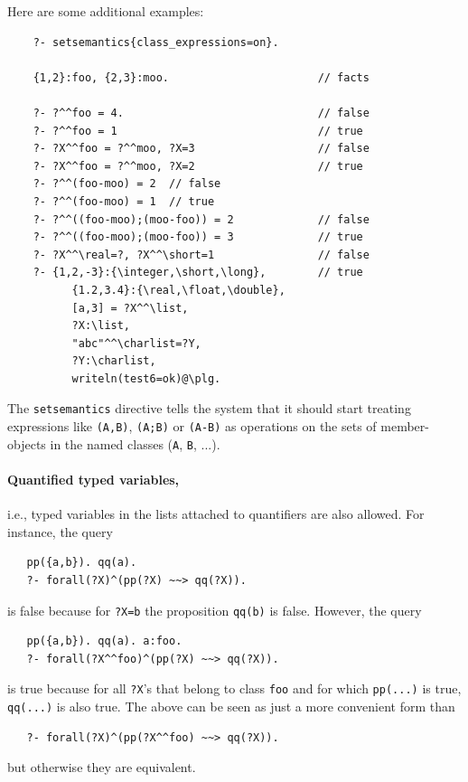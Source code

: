\documentclass[11pt]{article}
\begin{document}
Here are some additional examples:
\begin{verbatim}
    ?- setsemantics{class_expressions=on}.

    {1,2}:foo, {2,3}:moo.                       // facts

    ?- ?^^foo = 4.                              // false
    ?- ?^^foo = 1                               // true
    ?- ?X^^foo = ?^^moo, ?X=3                   // false
    ?- ?X^^foo = ?^^moo, ?X=2                   // true
    ?- ?^^(foo-moo) = 2  // false
    ?- ?^^(foo-moo) = 1  // true
    ?- ?^^((foo-moo);(moo-foo)) = 2             // false
    ?- ?^^((foo-moo);(moo-foo)) = 3             // true
    ?- ?X^^\real=?, ?X^^\short=1                // false
    ?- {1,2,-3}:{\integer,\short,\long},        // true
          {1.2,3.4}:{\real,\float,\double},
          [a,3] = ?X^^\list,
          ?X:\list,
          "abc"^^\charlist=?Y,
          ?Y:\charlist,
          writeln(test6=ok)@\plg.
\end{verbatim}
The \texttt{setsemantics} directive tells the system that 
it should start treating expressions like \texttt{(A,B)}, \texttt{(A;B)}
or \texttt{(A-B)} as operations on the sets of member-objects in the named
classes (\texttt{A}, \texttt{B}, ...).   

\paragraph{Quantified typed variables,} i.e., typed variables in the lists
attached to quantifiers are also allowed. For instance, the query
\begin{verbatim}
   pp({a,b}). qq(a).
   ?- forall(?X)^(pp(?X) ~~> qq(?X)).
\end{verbatim}
is false because for \texttt{?X=b} the proposition \texttt{qq(b)} is false.
However, the query
\begin{verbatim}
   pp({a,b}). qq(a). a:foo.
   ?- forall(?X^^foo)^(pp(?X) ~~> qq(?X)).
\end{verbatim}
is true because for all \texttt{?X}'s that belong to class \texttt{foo} and
for which \texttt{pp(...)} is true, \texttt{qq(...)} is also true.  
The above can be seen as just a more convenient form than
\begin{verbatim}
   ?- forall(?X)^(pp(?X^^foo) ~~> qq(?X)).
\end{verbatim}
but otherwise they are equivalent.
\end{document}
